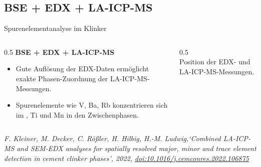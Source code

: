 \documentclass[10pt,aspectratio=169]{beamer}
\newcommand{\doi}[1]{\href{https://doi.org/#1}{doi:#1}}
\begin{document}
\subsection{BSE + EDX + LA-ICP-MS}
\begin{frame}{Spurenelementanalyse im Klinker}
  \begin{columns}
    \begin{column}{0.5\textwidth}
      \textbf{BSE + EDX + LA-ICP-MS}
      \begin{itemize}
        \item Gute Auflösung der EDX-Daten ermöglicht exakte Phasen-Zuordnung der LA-ICP-MS-Messungen.
        \item Spurenelemente wie V, Ba, Rb konzentrieren sich im , Ti und Mn in den Zwischenphasen.
      \end{itemize}
    \end{column}
    \begin{column}{0.5\textwidth}
      \centering
      \\
      \footnotesize Position der EDX- und LA-ICP-MS-Messungen.\\ %

    \end{column}
  \end{columns}
   \vfill\raggedleft\tiny\itshape F. Kleiner, M. Decker, C. Rößler, H. Hilbig, H.-M. Ludwig,`Combined LA-ICP-MS and SEM-EDX analyses for spatially resolved major, minor and trace element detection in cement clinker phases', 2022, \doi{10.1016/j.cemconres.2022.106875}%
\end{frame}
\end{document}
